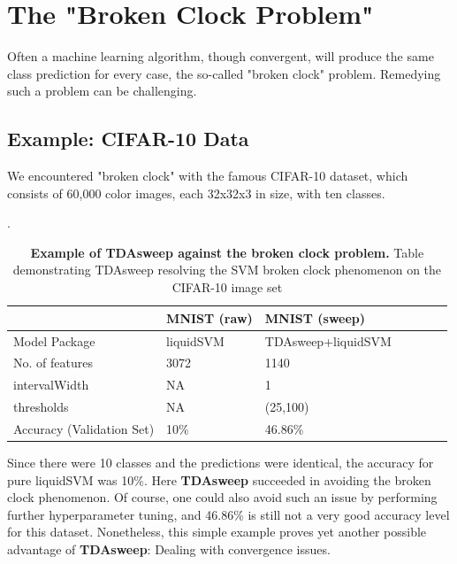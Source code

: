 \documentclass{article}
\begin{document}
\section{The "Broken Clock Problem"}
Often a machine learning algorithm, though convergent, will produce the same class prediction for every case, the so-called "broken clock" problem. Remedying such a problem can be challenging.

\subsection{Example: CIFAR-10 Data}
We encountered "broken clock" with the famous CIFAR-10 dataset, which consists of 60,000 color images, each 32x32x3 in size, with ten classes.

\begin{table}[!ht]
\centering
\caption{{\bf Example of TDAsweep against the broken clock problem.} Table demonstrating TDAsweep resolving the SVM broken clock phenomenon on the CIFAR-10 image set}.
\begin{tabular}{|l|l|l|l|l|l|l|}
\hline
\multicolumn{1}{|l|}{} & \multicolumn{1}{|l|}{\bf MNIST (raw)} & \multicolumn{1}{|l|}{\bf MNIST (sweep)} \\\hline

Model Package & liquidSVM & TDAsweep+liquidSVM  \\ \hline
No. of features & 3072 & 1140   \\ \hline
intervalWidth & NA & 1   \\ \hline
thresholds & NA & (25,100)   \\ \hline
Accuracy (Validation Set) & 10\% & 46.86\%  \\ \hline
\end{tabular}
\label{broken_clk}
\end{table}

Since there were 10 classes and the predictions were identical, the accuracy for pure liquidSVM was 10\%. Here \textbf{TDAsweep} succeeded in avoiding the broken clock phenomenon. Of course, one could also avoid such an issue by performing further hyperparameter tuning, and 46.86\% is still not a very good accuracy level for this dataset. Nonetheless, this simple example proves yet another possible advantage of \textbf{TDAsweep}: Dealing with convergence issues.
\end{document}
